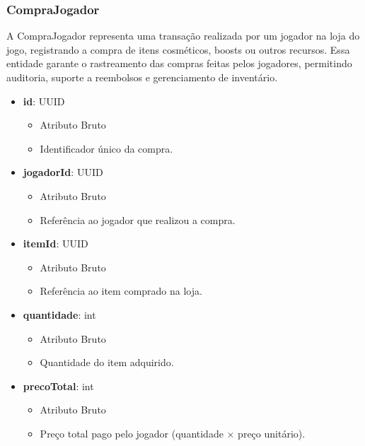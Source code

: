    \subsubsection{CompraJogador}
    A CompraJogador representa uma transação realizada por um jogador na loja do jogo, registrando a compra de itens cosméticos, boosts ou outros recursos. Essa entidade garante o rastreamento das compras feitas pelos jogadores, permitindo auditoria, suporte a reembolsos e gerenciamento de inventário.
    \begin{itemize}
        \item \textbf{id}: UUID  
              \begin{itemize}
                  \item Atributo Bruto
                  \item Identificador único da compra.
              \end{itemize}
    
        \item \textbf{jogadorId}: UUID  
              \begin{itemize}
                  \item Atributo Bruto
                  \item Referência ao jogador que realizou a compra.
              \end{itemize}
    
        \item \textbf{itemId}: UUID  
              \begin{itemize}
                  \item Atributo Bruto
                  \item Referência ao item comprado na loja.
              \end{itemize}
    
        \item \textbf{quantidade}: int  
              \begin{itemize}
                  \item Atributo Bruto
                  \item Quantidade do item adquirido.
              \end{itemize}
    
        \item \textbf{precoTotal}: int  
              \begin{itemize}
                  \item Atributo Bruto
                  \item Preço total pago pelo jogador (quantidade × preço unitário).
              \end{itemize}
    

\end{itemize}
